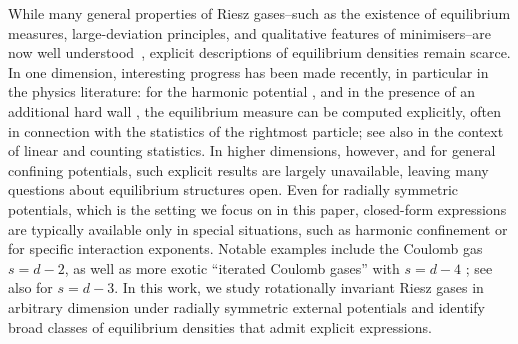 \documentclass[10pt]{amsart}
\theoremstyle{plain}
\theoremstyle{remark}
\numberwithin{equation}{section}
\begin{document}
While many general properties of Riesz gases--such as the existence of equilibrium measures, large-deviation principles, and qualitative features of minimisers--are now well understood~\cite{Lew22,Se24}, explicit descriptions of equilibrium densities remain scarce. In one dimension, interesting progress has been made recently, in particular in the physics literature: for the harmonic potential \cite{ADKKMMS19}, and in the presence of an additional hard wall \cite{DKMSS17,KKKMMS21,KKKMMS22,DM06,DM08}, the equilibrium measure can be computed explicitly, often in connection with the statistics of the rightmost particle; see also \cite{LS25} in the context of linear and counting statistics. In higher dimensions, however, and for general confining potentials, such explicit results are largely unavailable, leaving many questions about equilibrium structures open. Even for radially symmetric potentials, which is the setting we focus on in this paper, closed-form expressions are typically available only in special situations, such as harmonic confinement or for specific interaction exponents.
Notable examples include the Coulomb gas $s=d-2$, as well as more exotic
``iterated Coulomb gases'' with $s=d-4$ \cite{CSW23}; see also \cite{CSW22} for $s=d-3$. 
In this work, we study rotationally invariant Riesz gases in arbitrary dimension under radially symmetric external potentials and identify broad
classes of equilibrium densities that admit explicit expressions.
 
\end{document}
